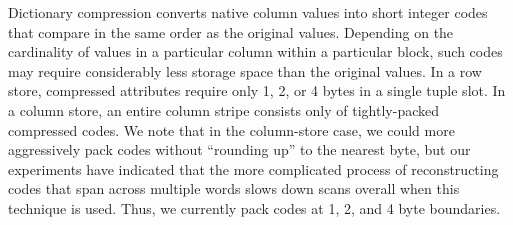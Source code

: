Dictionary compression converts native column values into short integer codes that compare in the same order as the original values. Depending on the cardinality of values in a particular column within a particular block, such codes may require considerably less storage space than the original values. In a row store, compressed attributes require only 1, 2, or 4 bytes in a single tuple slot. In a column store, an entire column stripe consists only of tightly-packed compressed codes.  We note
that in the column-store case, we could more aggressively pack codes without ``rounding up'' to the nearest byte, but our experiments have indicated that the more complicated process of reconstructing codes that span across multiple words slows down scans overall when this technique is used. Thus, we currently pack codes at 1, 2, and 4 byte boundaries.





